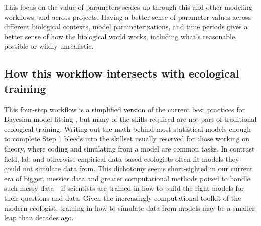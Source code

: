 \documentclass[11pt]{article}
\begin{document}
{This focus on the value of parameters scales up through this and other modeling workflows, and across projects. Having a better sense of parameter values across different biological contexts, model parameterizations, and time periods gives a better sense of how the biological world works, including what's reasonable, possible or wildly unrealistic. %

\subsection*{How this workflow intersects with ecological training} %

This four-step workflow is a simplified version of the current best practices for Bayesian model fitting  \citep{betanworkflow,vandeschoot2021}, but many of the skills required are not part of traditional ecological training. Writing out the math behind most statistical models enough to complete Step 1 bleeds into the skillset usually reserved for those working on theory, where coding and simulating from a model are common tasks. In contrast field, lab and otherwise empirical-data based ecologists often fit models they could not simulate data from. This dichotomy seems short-sighted in our current era of bigger, messier data and greater computational methods poised to handle such messy data---if scientists are trained in how to build the right models for their questions and data. %
Given the increasingly computational toolkit of the modern ecologist, training in how to simulate data from models may be a smaller leap than decades ago.

}
\end{document}
